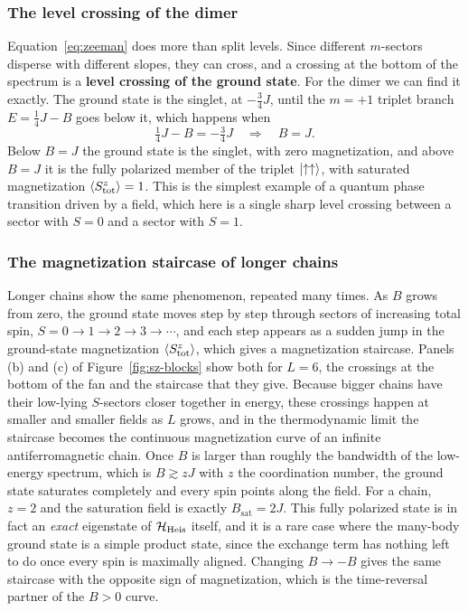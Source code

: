 \documentclass[lecture_notes.tex]{subfiles}
\begin{document}
\subsubsection{The level crossing of the dimer}
Equation~\eqref{eq:zeeman} does more than split levels. Since different $m$-sectors disperse with
different slopes, they can cross, and a crossing at the bottom of the spectrum is a
\textbf{level crossing of the ground state}. For the dimer we can find it exactly. The ground state
is the singlet, at $-\tfrac34J$, until the $m=+1$ triplet branch $E=\tfrac14J-B$ goes below it,
which happens when
\begin{equation}
  \tfrac14J - B = -\tfrac34J \quad\Longrightarrow\quad B = J.
  \label{eq:crossingfield}
\end{equation}
Below $B=J$ the ground state is the singlet, with zero magnetization, and above $B=J$ it is the fully
polarized member of the triplet $\ket{\uparrow\uparrow}$, with saturated magnetization
$\expval{S_{\mathrm{tot}}^z}=1$. This is the simplest example of a quantum phase transition driven by
a field, which here is a single sharp level crossing between a sector with $S=0$ and a sector with
$S=1$.

\subsubsection{The magnetization staircase of longer chains}
Longer chains show the same phenomenon, repeated many times. As $B$ grows from zero, the ground state
moves step by step through sectors of increasing total spin, $S=0\to1\to2\to3\to\cdots$, and each
step appears as a sudden jump in the ground-state magnetization $\expval{S_{\mathrm{tot}}^z}$, which
gives a magnetization staircase. Panels (b) and (c) of Figure~\ref{fig:sz-blocks} show both for
$L=6$, the crossings at the bottom of the fan and the staircase that they give. Because bigger
chains have their low-lying $S$-sectors closer together in energy, these crossings happen at smaller
and smaller fields as $L$ grows, and in the thermodynamic limit the staircase becomes the continuous
magnetization curve of an infinite antiferromagnetic chain. Once $B$ is larger than roughly the
bandwidth of the low-energy spectrum, which is $B\gtrsim zJ$ with $z$ the coordination number, the
ground state saturates completely and every spin points along the field. For a chain, $z=2$ and the
saturation field is exactly $B_{\mathrm{sat}}=2J$. This fully polarized state is in fact an
\emph{exact} eigenstate of $\mathcal{H}_{\mathrm{Heis}}$ itself, and it is a rare case where the many-body
ground state is a simple product state, since the exchange term has nothing left to do once every
spin is maximally aligned. Changing $B\to-B$ gives the same staircase with the opposite sign of
magnetization, which is the time-reversal partner of the $B>0$ curve.
\end{document}
